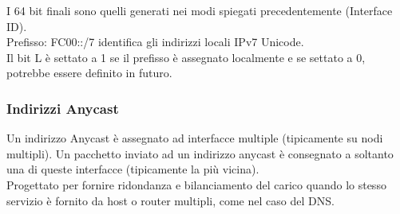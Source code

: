 \documentclass{article}
\begin{document}
I 64 bit finali sono quelli generati nei modi spiegati precedentemente (Interface ID). \\ Prefisso: FC00::/7 identifica gli indirizzi locali IPv7 Unicode. \\ Il bit L è settato a 1 se il prefisso è assegnato localmente e se settato a 0, potrebbe essere definito in futuro.

\subsubsection{Indirizzi Anycast}
Un indirizzo Anycast è assegnato ad interfacce multiple (tipicamente su nodi multipli). Un pacchetto inviato ad un indirizzo anycast è consegnato a soltanto una di queste interfacce (tipicamente la più vicina). \\ Progettato per fornire ridondanza e bilanciamento del carico quando lo stesso servizio è fornito da host o router multipli, come nel caso del DNS.
\end{document}
